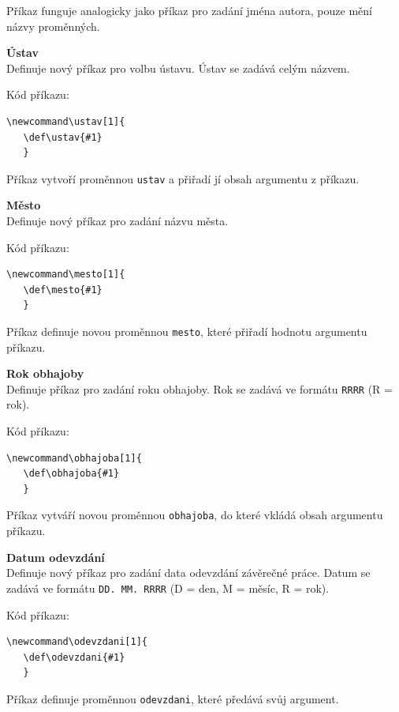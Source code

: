 Příkaz funguje analogicky jako příkaz pro zadání jména autora, pouze mění názvy proměnných.

\vspace{8pt}
\textbf{Ústav}\\
Definuje nový příkaz pro volbu ústavu. Ústav se zadává celým názvem.

Kód příkazu:

\begin{verbatim}
\newcommand\ustav[1]{
   \def\ustav{#1}
   }
\end{verbatim}

Příkaz vytvoří proměnnou \verb|ustav| a přiřadí jí obsah argumentu z příkazu.

\vspace{8pt}
\textbf{Město}\\
Definuje nový příkaz pro zadání názvu města.

Kód příkazu:

\begin{verbatim}
\newcommand\mesto[1]{
   \def\mesto{#1}
   }
\end{verbatim}

Příkaz definuje novou proměnnou \verb|mesto|, které přiřadí hodnotu argumentu příkazu.

\vspace{8pt}
\textbf{Rok obhajoby}\\
Definuje příkaz pro zadání roku obhajoby. Rok se zadává ve formátu \verb|RRRR| (R = rok).

Kód příkazu:

\begin{verbatim}
\newcommand\obhajoba[1]{
   \def\obhajoba{#1}
   }
\end{verbatim}

Příkaz vytváří novou proměnnou \verb|obhajoba|, do které vkládá obsah argumentu příkazu.

\vspace{8pt}
\textbf{Datum odevzdání}\\
Definuje nový příkaz pro zadání data odevzdání závěrečné práce. Datum se zadává ve formátu \verb|DD. MM. RRRR| (D = den, M = měsíc, R = rok).

Kód příkazu:

\begin{verbatim}
\newcommand\odevzdani[1]{
   \def\odevzdani{#1}
   }
\end{verbatim}

Příkaz definuje proměnnou \verb|odevzdani|, které předává svůj argument.

